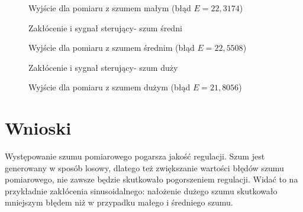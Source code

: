 \begin{figure}[H]
\centering

\caption{Wyjście dla pomiaru z szumem małym (błąd $E=22,3174$)}
\end{figure}


\begin{figure}[H]
\centering

\caption{Zakłócenie i sygnał sterujący- szum średni}
\end{figure}

\begin{figure}[H]
\centering

\caption{Wyjście dla pomiaru z szumem średnim (błąd $E=22,5508$)}
\end{figure}

\begin{figure}[H]
\centering

\caption{Zakłócenie i sygnał sterujący- szum duży}
\end{figure}

\begin{figure}[H]
\centering

\caption{Wyjście dla pomiaru z szumem dużym (błąd $E=21,8056$)}
\end{figure}

\section{Wnioski}
Występowanie szumu pomiarowego pogarsza jakość regulacji.
Szum jest generowany w sposób losowy, dlatego też zwiększanie wartości błędów szumu pomiarowego, nie zawsze będzie skutkowało pogorszeniem regulacji. Widać to na przykładnie zakłócenia sinusoidalnego: nałożenie dużego szumu skutkowało mniejszym błędem niż w przypadku małego i średniego szumu.
\smallskip


